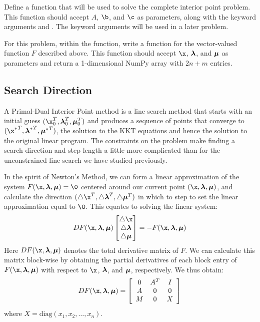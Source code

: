 \begin{problem} %
Define a function  that will be used to solve the complete interior point problem.
This function should accept $A$, $\b$, and $\c$ as parameters, along with the keyword arguments  and .
The keyword arguments will be used in a later problem.

For this problem, within the  function, write a function for the vector-valued function $F$ described above.
This function should accept $\x$, $\boldsymbol{\lambda}$, and $\boldsymbol{\mu}$ as parameters and return a 1-dimensional NumPy array with $2n+m$ entries.
\end{problem}

\subsection*{Search Direction}

A Primal-Dual Interior Point method is a line search method that starts with an initial guess $(\x_0^T, \Lamb_0^T, \Mu_0^T)$ and produces a sequence of points that converge to $({\x^*}^T, {\Lamb^*}^T, {\Mu^*}^T)$, the solution to the KKT equations and hence the solution to the original linear program.
The constraints on the problem make finding a search direction and step length a little more complicated than for the unconstrained line search we have studied previously.

In the spirit of Newton's Method, we can form a linear approximation of the system $F(\x,\Lamb,\Mu) = \0$ centered around our current point $(\x, \Lamb, \Mu)$, and calculate the direction $(\triangle \x^T, \triangle \Lamb^T, \triangle \Mu^T)$ in which to step to set the linear approximation equal to $\0$.
This equates to solving the linear system:
\begin{align}
DF(\x,\Lamb,\Mu)
\begin{bmatrix}\triangle \x\\ \triangle \Lamb\\ \triangle \Mu\end{bmatrix}
= - F(\x,\Lamb,\Mu) \label{eq:naiveNewton}
\end{align}
Here $DF(\x,\Lamb,\Mu)$ denotes the total derivative matrix of $F$.
We can calculate this matrix block-wise by obtaining the partial derivatives of each block entry of $F(\x,\Lamb, \Mu)$ with respect to $\x$, $\boldsymbol{\lambda}$, and $\boldsymbol{\mu}$, respectively.
We thus obtain:
\[
DF(\x,\Lamb,\Mu) = \left[\begin{array}{ccc}
0 & A^T & I \\
A & 0 & 0 \\
M & 0 & X
\end{array}\right]
\]
where $X = \text{diag}(x_1,x_2,\ldots,x_n).$

